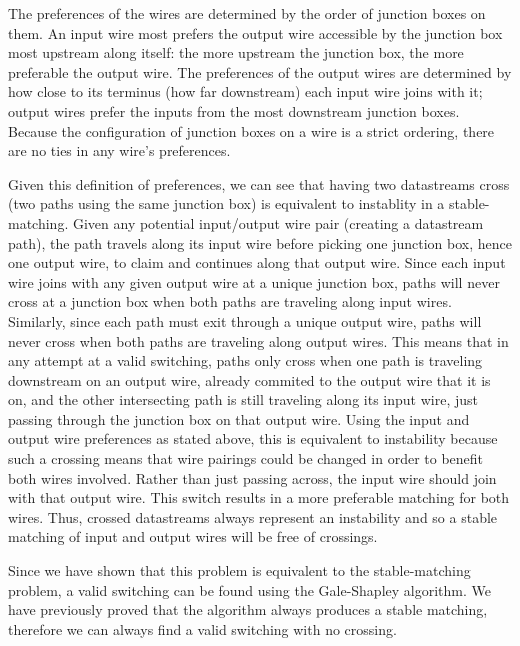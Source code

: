 \documentclass[a4paper]{article}
\begin{document}
\begin{itemize}
The preferences of the wires are determined by the order of junction boxes on them. An input wire most prefers the output wire accessible by the junction box most upstream along itself: the more upstream the junction box, the more preferable the output wire. The preferences of the output wires are determined by how close to its terminus (how far downstream) each input wire joins with it; output wires prefer the inputs from the most downstream junction boxes. Because the configuration of junction boxes on a wire is a strict ordering, there are no ties in any wire's preferences.

Given this definition of preferences, we can see that having two datastreams cross (two paths using the same junction box) is equivalent to instablity in a stable-matching. Given any potential input/output wire pair (creating a datastream path), the path travels along its input wire before picking one junction box, hence one output wire, to claim and continues along that output wire. Since each input wire joins with any given output wire at a unique junction box, paths will never cross at a junction box when both paths are traveling along input wires. Similarly, since each path must exit through a unique output wire, paths will never cross when both paths are traveling along output wires. This means that in any attempt at a valid switching, paths only cross when one path is traveling downstream on an output wire, already commited to the output wire that it is on, and the other intersecting path is still traveling along its input wire, just passing through the junction box on that output wire. Using the input and output wire preferences as stated above, this is equivalent to instability because such a crossing means that wire pairings could be changed in order to benefit both wires involved. Rather than just passing across, the input wire should join with that output wire. This switch results in a more preferable matching for both wires. Thus, crossed datastreams always represent an instability and so a stable matching of input and output wires will be free of crossings. 

Since we have shown that this problem is equivalent to the stable-matching problem, a valid switching can be found using the Gale-Shapley algorithm. We have previously proved that the algorithm always produces a stable matching, therefore we can always find a valid switching with no crossing.
\\
\\


\end{itemize}
\end{document}
